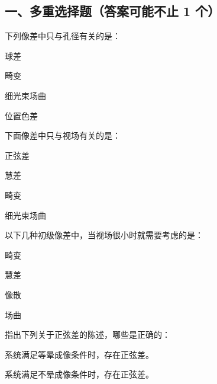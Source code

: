 \documentclass[standard, analysis, notocnum]{ExBook}
\newcommand{\answerarea}[1][8cm]{%
  \par\vspace{2mm}%
  \noindent{\color{themeColor!35}\rule{\linewidth}{0.4pt}}\par
  \noindent\begin{minipage}[t][#1][t]{\linewidth}\vspace{0pt}\end{minipage}\par
  \noindent{\color{themeColor!35}\rule{\linewidth}{0.4pt}}\par
}
\begin{document}
\subsection{一、多重选择题（答案可能不止 1 个）}
\begin{qitems}
\begin{bbox}
\qitem 下列像差中只与孔径有关的是：
\par\noindent\hspace{2em}球差
\par\noindent\hspace{2em}畸变
\par\noindent\hspace{2em}细光束场曲
\par\noindent\hspace{2em}位置色差
\answerarea[3.5cm]
\end{bbox}
\begin{bbox}
\qitem 下面像差中只与视场有关的是：
\par\noindent\hspace{2em}正弦差
\par\noindent\hspace{2em}慧差
\par\noindent\hspace{2em}畸变
\par\noindent\hspace{2em}细光束场曲
\answerarea[3.5cm]
\end{bbox}
\begin{bbox}
\qitem 以下几种初级像差中，当视场很小时就需要考虑的是：
\par\noindent\hspace{2em}畸变
\par\noindent\hspace{2em}慧差
\par\noindent\hspace{2em}像散
\par\noindent\hspace{2em}场曲
\answerarea[3.5cm]
\end{bbox}
\begin{bbox}
\qitem 指出下列关于正弦差的陈述，哪些是正确的：
\par\noindent\hspace{2em}系统满足等晕成像条件时，存在正弦差。
\par\noindent\hspace{2em}系统满足不晕成像条件时，存在正弦差。

\end{bbox}
\end{qitems}
\end{document}
